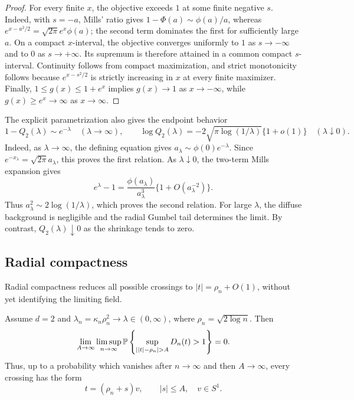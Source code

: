 \begin{proof}
For every finite \(x\), the objective exceeds \(1\) at some finite negative
\(s\). Indeed, with \(s=-a\), Mills' ratio gives
\(1-\Phi(a)\sim\phi(a)/a\), whereas
\(e^{x-a^2/2}=\sqrt{2\pi}e^x\phi(a)\); the second term dominates the first
for sufficiently large \(a\). On a compact \(x\)-interval, the objective
converges uniformly to \(1\) as \(s\to-\infty\) and to \(0\) as
\(s\to+\infty\). Its supremum is therefore attained in a common compact
\(s\)-interval. Continuity follows from compact maximization, and strict
monotonicity follows because \(e^{x-s^2/2}\) is strictly increasing in \(x\)
at every finite maximizer. Finally,
\(1\le g(x)\le1+e^x\) implies \(g(x)\to1\) as \(x\to-\infty\), while
\(g(x)\ge e^x\to\infty\) as \(x\to\infty\).
\end{proof}

The explicit parametrization also gives the endpoint behavior
\[
    1-Q_2(\lambda)\sim e^{-\lambda}\quad(\lambda\to\infty),
    \qquad
    \log Q_2(\lambda)
    =
    -2\sqrt{\pi\log(1/\lambda)}\{1+o(1)\}
    \quad(\lambda\downarrow0).
\]
Indeed, as \(\lambda\to\infty\), the defining equation gives
\(a_\lambda\sim\phi(0)e^{-\lambda}\). Since
\(e^{-x_\lambda}=\sqrt{2\pi}a_\lambda\), this proves the first relation.
As \(\lambda\downarrow0\), the two-term Mills expansion gives
\[
 e^\lambda-1
 =\frac{\phi(a_\lambda)}{a_\lambda^3}
   \{1+O(a_\lambda^{-2})\}.
\]
Thus \(a_\lambda^2\sim2\log(1/\lambda)\), which proves the second relation.
For large \(\lambda\), the diffuse background is negligible and the radial
Gumbel tail determines the limit. By contrast,
\(Q_2(\lambda)\downarrow0\) as the shrinkage tends to zero.

\subsection{Radial compactness}

Radial compactness reduces all possible crossings to
\(|t|=\rho_n+O(1)\), without yet identifying the limiting field.

\begin{proposition}
\label{prop:d-two-radial-compactness}
Assume \(d=2\) and \(\lambda_n=\kappa_n\rho_n^2\to\lambda\in(0,\infty)\),
where \(\rho_n=\sqrt{2\log n}\).  Then
\[
    \lim_{A\to\infty}\limsup_{n\to\infty}
    \Pbb\left\{
        \sup_{\left||t|-\rho_n\right|>A}D_n(t)>1
    \right\}=0 .
\]
Thus, up to a probability which vanishes after \(n\to\infty\) and then
\(A\to\infty\), every crossing has the form
\[
    t=(\rho_n+s)v,\qquad |s|\le A,\quad v\in S^1 .
\]
\end{proposition}

